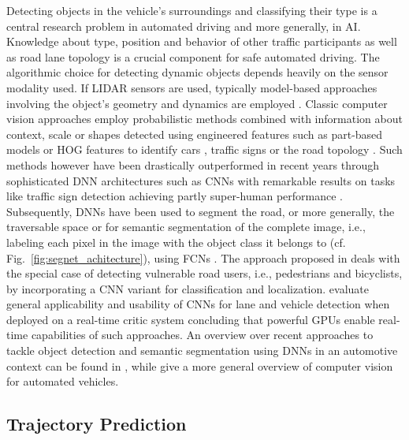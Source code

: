 Detecting objects in the vehicle's surroundings and classifying their type is a central research problem in automated driving and more generally, in \ac{AI}.
Knowledge about type, position and behavior of other traffic participants as well as road lane topology is a crucial component for safe automated driving.
The algorithmic choice for detecting dynamic objects depends heavily on the sensor modality used.
If \ac{LIDAR} sensors are used, typically model-based approaches involving the object's geometry and dynamics are employed \parencite{Petrovskaya2009a, Petrovskaya2009, Darms2008}.
Classic computer vision approaches employ probabilistic methods combined with information about context, scale or shapes detected using engineered features such as part-based models or \ac{HOG} features to identify cars \parencite{Held2012}, traffic signs \parencite{Li2015} or the road topology \parencite{Alvarez2011, Beyeler2014}.
Such methods however have been drastically outperformed in recent years through sophisticated \ac{DNN} architectures such as \acp{CNN} with remarkable results on tasks like traffic sign detection \parencite{Ciresan2012, Sermanet2011} achieving partly super-human performance \parencite{Stallkamp2012}.
Subsequently, \acp{DNN} have been used to segment the road, or more generally, the traversable space \parencite{Mohan2014, Bittel2015} or for semantic segmentation of the complete image, i.e., labeling each pixel in the image with the object class it belongs to (cf. Fig.~\ref{fig:segnet_achitecture}), using \acp{FCN} \parencite{Badrinarayanan2015, Long2015, Chen2018}.
The approach proposed in \textcite{Li2017} deals with the special case of detecting vulnerable road users, i.e., pedestrians and bicyclists, by incorporating a \ac{CNN} variant for classification and localization.
\textcite{Huval2015} evaluate general applicability and usability of \acp{CNN} for lane and vehicle detection when deployed on a real-time critic system concluding that powerful \acp{GPU} enable real-time capabilities of such approaches.
An overview over recent approaches to tackle object detection and semantic segmentation using \acp{DNN} in an automotive context can be found in \textcite{Feng2019}, while \textcite{Janai2017} give a more general overview of computer vision for automated vehicles.

\subsection{Trajectory Prediction}%
\label{subsec:trajectory_prediction}

